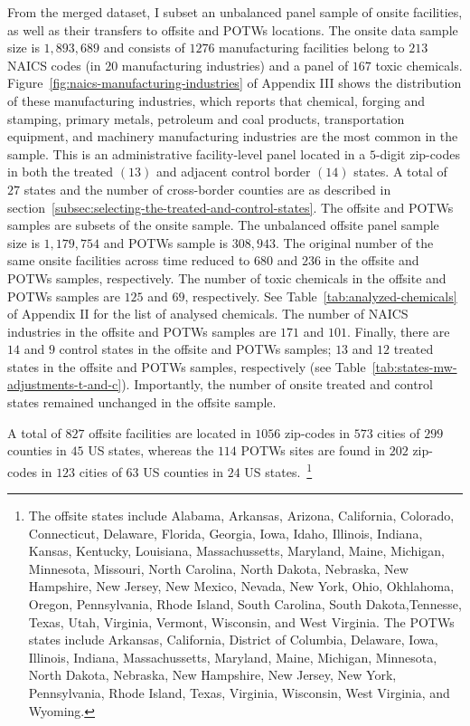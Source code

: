 \documentclass[12pt, english]{article}
\begin{document}
    From the merged dataset, I subset an unbalanced panel sample of onsite facilities, as well as their transfers to offsite and POTWs locations. The onsite data sample size is $1,893,689$ and consists of $1276$ manufacturing facilities belong to $213$ NAICS codes (in $20$ manufacturing industries) and a panel of $167$ toxic chemicals. Figure~\ref{fig:naics-manufacturing-industries} of Appendix III shows the distribution of these manufacturing industries, which reports that chemical, forging and stamping, primary metals, petroleum and coal products, transportation equipment, and machinery manufacturing industries are the most common in the sample. This is an administrative facility-level panel located in a $5$-digit zip-codes in both the treated $(13)$ and adjacent control border $(14)$ states. A total of $27$ states and the number of cross-border counties are as described in section~\ref{subsec:selecting-the-treated-and-control-states}. The offsite and POTWs samples are subsets of the onsite sample. The unbalanced offsite panel sample size is $1,179,754$ and POTWs sample is $308,943$. The original number of the same onsite facilities across time reduced to $680$ and $236$ in the offsite and POTWs samples, respectively. The number of toxic chemicals in the offsite and POTWs samples are $125$ and $69$, respectively. See Table~\ref{tab:analyzed-chemicals} of Appendix II for the list of analysed chemicals. The number of NAICS industries in the offsite and POTWs samples are $171$ and $101$. Finally, there are $14$ and $9$ control states in the offsite and POTWs samples; $13$ and $12$ treated states in the offsite and POTWs samples, respectively (see Table~\ref{tab:states-mw-adjustments-t-and-c}). Importantly, the number of onsite treated and control states remained unchanged in the offsite sample.

    A total of $827$ offsite facilities are located in $1056$ zip-codes in $573$ cities of $299$ counties in $45$ US states, whereas the $114$ POTWs sites are found in $202$ zip-codes in $123$ cities of $63$ US counties in $24$ US states.~\footnote{\tiny The offsite states include Alabama, Arkansas, Arizona, California, Colorado, Connecticut, Delaware, Florida, Georgia, Iowa, Idaho, Illinois, Indiana, Kansas, Kentucky, Louisiana, Massachussetts, Maryland, Maine, Michigan, Minnesota, Missouri, North Carolina, North Dakota, Nebraska, New Hampshire, New Jersey, New Mexico, Nevada, New York, Ohio, Okhlahoma, Oregon, Pennsylvania, Rhode Island, South Carolina, South Dakota,Tennesse, Texas, Utah, Virginia, Vermont, Wisconsin, and West Virginia. The POTWs states include Arkansas, California, District of Columbia, Delaware, Iowa, Illinois, Indiana, Massachussetts, Maryland, Maine, Michigan, Minnesota, North Dakota, Nebraska, New Hampshire, New Jersey, New York, Pennsylvania, Rhode Island, Texas, Virginia, Wisconsin, West Virginia, and Wyoming.}
\end{document}
